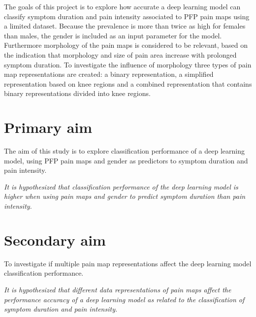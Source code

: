 \noindent
The goals of this project is to explore how accurate a deep learning model can classify symptom duration and pain intensity associated to PFP pain maps using a limited dataset. Because the prevalence is more than twice as high for females than males, the gender is included as an input parameter for the model. 
Furthermore morphology of the pain maps is considered to be relevant, based on the indication that morphology and size of pain area increase with prolonged symptom duration. 
To investigate the influence of morphology three types of pain map representations are created: a binary representation, a simplified representation based on knee regions and a combined representation that contains binary representations divided into knee regions.   

\section{Primary aim}
The aim of this study is to explore classification performance of a deep learning model, using PFP pain maps and gender as predictors to symptom duration and pain intensity. 
\vspace{4mm}
\noindent
\begin{center}
\textit{It is hypothesized that classification performance of the deep learning model is higher when using pain maps and gender to predict symptom duration than pain intensity.}
\end{center}

\section{Secondary aim}
To investigate if multiple pain map representations affect the deep learning model classification performance.

\vspace{4mm}
\noindent
\begin{center}
\textit{It is hypothesized that different data representations of pain maps affect the performance
accuracy of a deep learning model as related to the classification of symptom duration and pain intensity.
}
\end{center}









